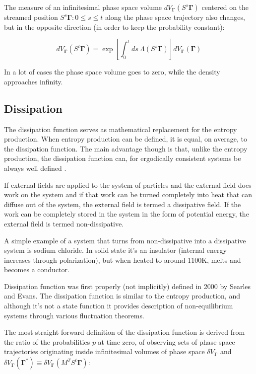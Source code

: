 \documentclass[a4paper,12pt,nofootinbib]{article}
\begin{document}
The measure of an infinitesimal phase space volume $dV_{\bm{\Gamma}}(S^s \bm{\Gamma})$ centered on the streamed position $S^s\bm{\Gamma} : 0 \leq s \leq t $ along the phase space trajectory also changes, but in the opposite direction (in order to keep the probability constant):

\begin{equation}
\label{PhaseVolumeExpansion}
  dV_{\bm{\Gamma}}(S^t \bm{\Gamma}) =\exp[\int_0^t ds\ \Lambda(S^s\bm{\Gamma})]dV_{\bm{\Gamma}}(\bm{\Gamma})
\end{equation}
 
In a lot of cases the phase space volume goes to zero, while the density approaches infinity.



\subsection{Dissipation}

The dissipation function serves as mathematical replacement for the entropy production. When entropy production can be defined, it is equal, on average, to the dissipation function. The main advantage though is that, unlike the entropy production, the dissipation function can, for ergodically consistent systems be always well defined \cite{Evans:2016tq}.

If external fields are applied to the system of particles and the external field does work on the system and if that work can be turned completely into heat that can diffuse out of the system, the external field is termed a dissipative field. If the work can be completely stored in the system in the form of potential energy, the external field is termed non-dissipative.

A simple example of a system that turns from non-dissipative into a dissipative system is sodium chloride. In solid state it's an insulator (internal energy increases through polarization), but when heated to around 1100K, melts and becomes a conductor.

Dissipation function was first properly (not implicitly) defined in 2000 by Searles and Evans.
The dissipation function is similar to the entropy production, and although it's not a state function it provides description of non-equilibrium systems through various fluctuation theorems.

The most straight forward definition of the dissipation function is derived from the ratio of the probabilities $p$ at time zero, of observing sets of phase space trajectories originating inside infinitesimal volumes of phase space $\delta V_{\bm{\Gamma}}$ and $\delta V_{\bm{\Gamma}}(\bm{\Gamma}^*)\equiv \delta V_{\bm{\Gamma}}(M^T S^t \bm{\Gamma})$:
\end{document}
